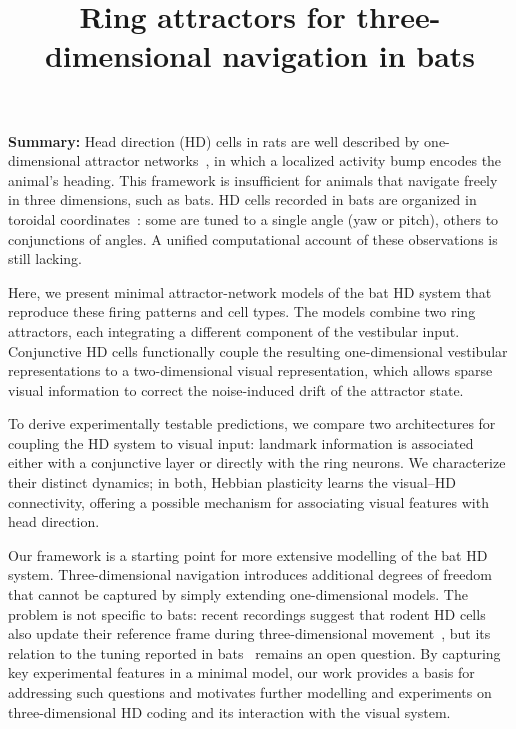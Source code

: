 \documentclass[12pt, letterpaper]{article}
\date{}
\author{}
\title{\color{custom}\large{\vspace{-1.5cm}%
Ring attractors for three-dimensional navigation in bats}}
\begin{document}
\maketitle
\vspace*{-2cm}

\textbf{Summary:} Head direction (HD) cells in rats are well described by one-dimensional attractor networks~\cite{Taube1990,Zhang1996}, in which a localized activity bump encodes the animal's heading. This framework is insufficient for animals that navigate freely in three dimensions, such as bats. HD cells recorded in bats are organized in toroidal coordinates~\cite{Finkelstein2015}: some are tuned to a single angle (yaw or pitch), others to conjunctions of angles. A unified computational account of these observations is still lacking.

Here, we present minimal attractor-network models of the bat HD system that reproduce these firing patterns and cell types. The models combine two ring attractors, each integrating a different component of the vestibular input. Conjunctive HD cells functionally couple the resulting one-dimensional vestibular representations to a two-dimensional visual representation, which allows sparse visual information to correct the noise-induced drift of the attractor state.

To derive experimentally testable predictions, we compare two architectures for coupling the HD system to visual input: landmark information is associated either with a conjunctive layer or directly with the ring neurons. We characterize their distinct dynamics; in both, Hebbian plasticity learns the visual--HD connectivity, offering a possible mechanism for associating visual features with head direction.

Our framework is a starting point for more extensive modelling of the bat HD system. Three-dimensional navigation introduces additional degrees of freedom that cannot be captured by simply extending one-dimensional models. The problem is not specific to bats: recent recordings suggest that rodent HD cells also update their reference frame during three-dimensional movement~\cite{Williams2026}, but its relation to the tuning reported in bats~\cite{Finkelstein2015} remains an open question. By capturing key experimental features in a minimal model, our work provides a basis for addressing such questions and motivates further modelling and experiments on three-dimensional HD coding and its interaction with the visual system.


\vspace*{-0.2cm}
\hrulefill
\end{document}
